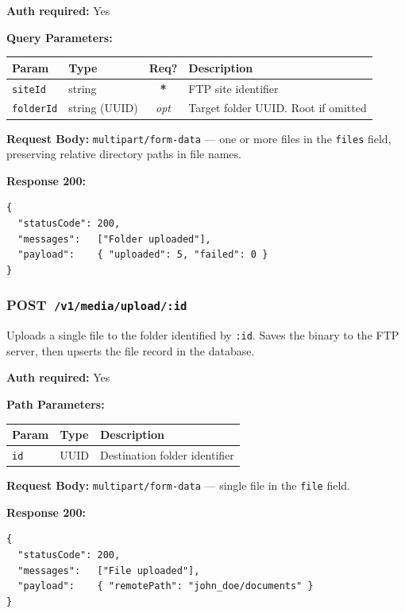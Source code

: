 \documentclass[12pt,a4paper]{article}
\newcommand{\httppost}[1]{%
  \colorbox{postcolor!20}{\textcolor{postcolor}{\textbf{\small POST}}}~\texttt{#1}%
}
\newcommand{\required}{\textcolor{danger}{\textbf{*}}}
\newcommand{\optional}{\textcolor{muted}{\textit{opt}}}
\begin{document}
\textbf{Auth required:} Yes

\textbf{Query Parameters:}

\begin{tabularx}{\linewidth}{llcX}
\toprule
\textbf{Param} & \textbf{Type} & \textbf{Req?} & \textbf{Description} \\
\midrule
\texttt{siteId}   & string & \required & FTP site identifier \\
\texttt{folderId} & string (UUID) & \optional & Target folder UUID. Root if omitted \\
\bottomrule
\end{tabularx}

\textbf{Request Body:} \texttt{multipart/form-data} — one or more files in the \texttt{files} field, preserving relative directory paths in file names.

\textbf{Response 200:}
\begin{lstlisting}
{
  "statusCode": 200,
  "messages":   ["Folder uploaded"],
  "payload":    { "uploaded": 5, "failed": 0 }
}
\end{lstlisting}

\vspace{0.5em}
\subsubsection{\httppost{/v1/media/upload/:id}}

Uploads a single file to the folder identified by \texttt{:id}. Saves the binary to the FTP server, then upserts the file record in the database.

\textbf{Auth required:} Yes

\textbf{Path Parameters:}

\begin{tabularx}{\linewidth}{llX}
\toprule
\textbf{Param} & \textbf{Type} & \textbf{Description} \\
\midrule
\texttt{id} & UUID & Destination folder identifier \\
\bottomrule
\end{tabularx}

\textbf{Request Body:} \texttt{multipart/form-data} — single file in the \texttt{file} field.

\textbf{Response 200:}
\begin{lstlisting}
{
  "statusCode": 200,
  "messages":   ["File uploaded"],
  "payload":    { "remotePath": "john_doe/documents" }
}
\end{lstlisting}
\end{document}

